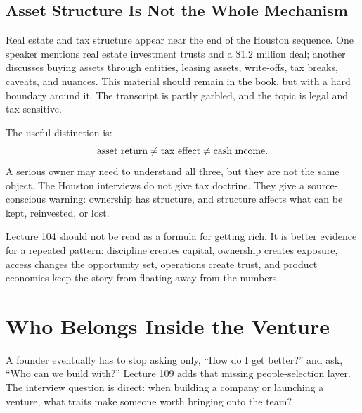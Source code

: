\documentclass[11pt,oneside]{book}
\begin{document}
\section{Asset Structure Is Not the Whole Mechanism}

Real estate and tax structure appear near the end of the Houston sequence. One speaker mentions real estate investment trusts and a \$1.2 million deal; another discusses buying assets through entities, leasing assets, write-offs, tax breaks, caveats, and nuances. This material should remain in the book, but with a hard boundary around it. The transcript is partly garbled, and the topic is legal and tax-sensitive.

The useful distinction is:
\[
\hbox{asset return}
\neq
\hbox{tax effect}
\neq
\hbox{cash income}.
\]
A serious owner may need to understand all three, but they are not the same object. The Houston interviews do not give tax doctrine. They give a source-conscious warning: ownership has structure, and structure affects what can be kept, reinvested, or lost.

\begin{remark}
Lecture 104 should not be read as a formula for getting rich. It is better evidence for a repeated pattern: discipline creates capital, ownership creates exposure, access changes the opportunity set, operations create trust, and product economics keep the story from floating away from the numbers.
\end{remark}


\chapter{Who Belongs Inside the Venture}

A founder eventually has to stop asking only, ``How do I get better?'' and ask, ``Who can we build with?'' Lecture 109 adds that missing people-selection layer. The interview question is direct: when building a company or launching a venture, what traits make someone worth bringing onto the team?
\end{document}

